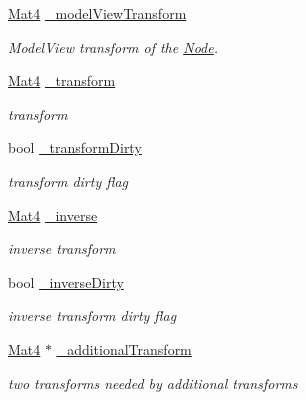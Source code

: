 \begin{DoxyCompactItemize}
\mbox{\label{classNode_a5a9eff249dd6cb82abd433f5cc54da6c}} 
\hyperlink{classMat4}{Mat4} \hyperlink{classNode_a5a9eff249dd6cb82abd433f5cc54da6c}{\+\_\+model\+View\+Transform}
\begin{DoxyCompactList}\small\item\em Model\+View transform of the \hyperlink{classNode}{Node}. \end{DoxyCompactList}\item 
\mbox{\label{classNode_a5a6686337fb93c284391bce7441e46db}} 
\hyperlink{classMat4}{Mat4} \hyperlink{classNode_a5a6686337fb93c284391bce7441e46db}{\+\_\+transform}
\begin{DoxyCompactList}\small\item\em transform \end{DoxyCompactList}\item 
\mbox{\label{classNode_afc05b246884e68da5bade2d3914d0f89}} 
bool \hyperlink{classNode_afc05b246884e68da5bade2d3914d0f89}{\+\_\+transform\+Dirty}
\begin{DoxyCompactList}\small\item\em transform dirty flag \end{DoxyCompactList}\item 
\mbox{\label{classNode_a9481aec57ff12d607c8526c16d0b19b7}} 
\hyperlink{classMat4}{Mat4} \hyperlink{classNode_a9481aec57ff12d607c8526c16d0b19b7}{\+\_\+inverse}
\begin{DoxyCompactList}\small\item\em inverse transform \end{DoxyCompactList}\item 
\mbox{\label{classNode_a44a4a23138837fc8be24e1ba1044b6e7}} 
bool \hyperlink{classNode_a44a4a23138837fc8be24e1ba1044b6e7}{\+\_\+inverse\+Dirty}
\begin{DoxyCompactList}\small\item\em inverse transform dirty flag \end{DoxyCompactList}\item 
\mbox{\label{classNode_aed06ce02d4241dc88abcef2d55d8b831}} 
\hyperlink{classMat4}{Mat4} $\ast$ \hyperlink{classNode_aed06ce02d4241dc88abcef2d55d8b831}{\+\_\+additional\+Transform}
\begin{DoxyCompactList}\small\item\em two transforms needed by additional transforms \end{DoxyCompactList}\item 

\end{DoxyCompactItemize}
